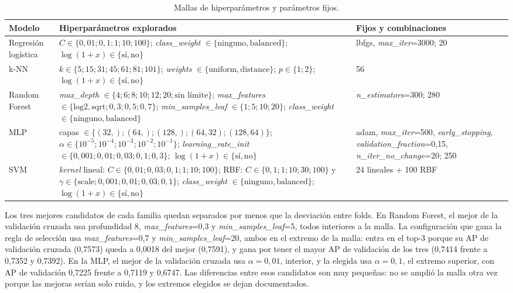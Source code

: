 \documentclass[journal]{IEEEtran}
\begin{document}
\begin{table}[t]
\centering
\caption{Mallas de hiperparámetros y parámetros fijos.}
\label{tab:mallas}
\scriptsize
\renewcommand{\arraystretch}{1.08}
\begin{tabular}{p{2.5cm} p{8.6cm} p{4.9cm}}
\toprule
\textbf{Modelo} & \textbf{Hiperparámetros explorados} & \textbf{Fijos y combinaciones} \\
\midrule
Regresión logística & $C\in\{0{,}01;0{,}1;1;10;100\}$; \textit{class\_weight} $\in\{\text{ninguno},\text{balanced}\}$; $\log(1+x)\in\{\text{sí},\text{no}\}$ & lbfgs, \textit{max\_iter}=3000; 20 \\
k-NN & $k\in\{5;15;31;45;61;81;101\}$; \textit{weights} $\in\{\text{uniform},\text{distance}\}$; $p\in\{1;2\}$; $\log(1+x)\in\{\text{sí},\text{no}\}$ & 56 \\
Random Forest & \textit{max\_depth} $\in\{4;6;8;10;12;20;\text{sin límite}\}$; \textit{max\_features} $\in\{\text{log2},\text{sqrt};0{,}3;0{,}5;0{,}7\}$; \textit{min\_samples\_leaf} $\in\{1;5;10;20\}$; \textit{class\_weight} $\in\{\text{ninguno},\text{balanced}\}$ & \textit{n\_estimators}=300; 280 \\
MLP & capas $\in\{(32,);(64,);(128,);(64,32);(128,64)\}$; $\alpha\in\{10^{-5};10^{-4};10^{-3};10^{-2};10^{-1}\}$; \textit{learning\_rate\_init} $\in\{0{,}001;0{,}01;0{,}03;0{,}1;0{,}3\}$; $\log(1+x)\in\{\text{sí},\text{no}\}$ & adam, \textit{max\_iter}=500, \textit{early\_stopping}, \textit{validation\_fraction}=0{,}15, \textit{n\_iter\_no\_change}=20; 250 \\
SVM & \textit{kernel} lineal: $C\in\{0{,}01;0{,}03;0{,}1;1;10;100\}$; RBF:
$C\in\{0{,}1;1;10;30;100\}$ y $\gamma\in\{\text{scale};0{,}001;0{,}01;0{,}03;0{,}1\}$;
\textit{class\_weight} $\in\{\text{ninguno},\text{balanced}\}$;
$\log(1+x)\in\{\text{sí},\text{no}\}$ & 24 lineales + 100 RBF \\
\bottomrule
\end{tabular}
\end{table}

Los tres mejores candidatos de cada familia quedan separados por menos que la desviación
entre folds. En Random Forest, el mejor de la validación cruzada usa profundidad 8,
\textit{max\_features}=0,3 y \textit{min\_samples\_leaf}=5, todos interiores a la malla. La
configuración que gana la regla de selección usa \textit{max\_features}=0,7 y
\textit{min\_samples\_leaf}=20, ambos en el extremo de la malla: entra en el top-3 porque su
AP de validación cruzada (0{,}7573) queda a 0{,}0018 del mejor (0{,}7591), y gana por tener
el mayor AP de validación de los tres (0{,}7414 frente a 0{,}7352 y 0{,}7392). En la MLP, el
mejor de la validación cruzada usa $\alpha=0{,}01$, interior, y la elegida usa
$\alpha=0{,}1$, el extremo superior, con AP de validación 0{,}7225 frente a 0{,}7119 y
0{,}6747. Las diferencias entre esos
candidatos son muy pequeñas: no se amplió la malla otra vez porque las mejoras serían
solo ruido, y los extremos elegidos se dejan documentados.
\end{document}
